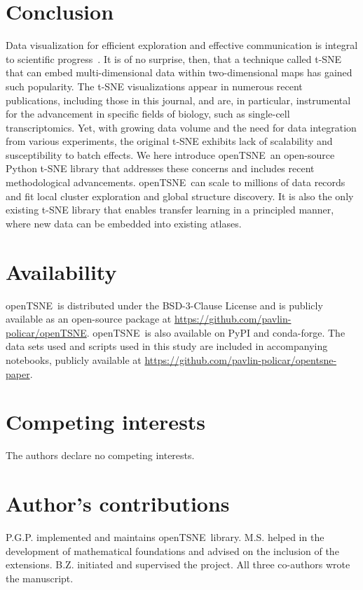 \documentclass[letter]{article}
\newcommand{\opentsne}{\textsf{openTSNE}}
\begin{document}
\section*{Conclusion}

Data visualization for efficient exploration and effective communication is integral to scientific progress~\cite{wong2012points}. It is of no surprise, then, that a technique called t-SNE that can embed multi-dimensional data within two-dimensional maps has gained such popularity. The t-SNE visualizations appear in numerous recent publications, including those in this journal, and are, in particular, instrumental for the advancement in specific fields of biology, such as single-cell transcriptomics. Yet, with growing data volume and the need for data integration from various experiments, the original t-SNE exhibits lack of scalability and susceptibility to batch effects. We here introduce \opentsne\, an open-source Python t-SNE library that addresses these concerns and includes recent methodological advancements. \opentsne\ can scale to millions of data records and fit local cluster exploration and global structure discovery. It is also the only existing t-SNE library that enables transfer learning in a principled manner, where new data can be embedded into existing atlases.

\section*{Availability}

\opentsne\ is distributed under the BSD-3-Clause License and is publicly
available as an open-source package at
\url{https://github.com/pavlin-policar/openTSNE}. \opentsne\ is also available
on \textsf{PyPI} and \textsf{conda-forge}. The data sets used and scripts used
in this study are included in accompanying notebooks, publicly available at
\url{https://github.com/pavlin-policar/opentsne-paper}.

\section*{Competing interests}
The authors declare no competing interests.

\section*{Author's contributions}
P.G.P. implemented and maintains \opentsne\ library. M.S. helped in the development of mathematical foundations and advised on the inclusion of the extensions. B.Z. initiated and supervised the project. All three co-authors wrote the manuscript.
\end{document}
